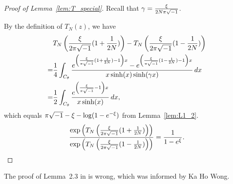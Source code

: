 \begin{proof}[Proof of Lemma~\ref{lem:T_special}]
Recall that $\gamma=\frac{\xi}{2N\pi\sqrt{-1}}$.
\par
By the definition of $T_N(z)$, we have
\begin{equation*}
\begin{split}
  &
  T_{N}\left(\frac{\xi}{2\pi\sqrt{-1}}(1+\frac{1}{2N})\right)
  -
  T_{N}\left(\frac{\xi}{2\pi\sqrt{-1}}(1-\frac{1}{2N})\right)
  \\
  =&
  \frac{1}{4}\int_{C_{\theta}}
  \frac{e^{\left(\frac{\xi}{\pi\sqrt{-1}}(1+\frac{1}{2N})-1\right)x}
       -e^{\left(\frac{\xi}{\pi\sqrt{-1}}(1-\frac{1}{2N})-1\right)x}}
       {x\sinh(x)\sinh(\gamma x)}
  \,dx
  \\
  =&
  \frac{1}{2}
  \int_{C_{\theta}}\frac{e^{\left(\frac{\xi}{\pi\sqrt{-1}}-1\right)x}}{x\sinh(x)}
  \,dx,
\end{split}
\end{equation*}
which equals $\pi\sqrt{-1}-\xi-\log(1-e^{-\xi})$ from Lemma~\ref{lem:L1_2}.
\begin{equation*}
  \frac{\exp\left(T_{N}\left(\frac{\xi}{2\pi\sqrt{-1}}(1+\frac{1}{2N})\right)\right)}
       {\exp\left(T_{N}\left(\frac{\xi}{2\pi\sqrt{-1}}(1-\frac{1}{2N})\right)\right)}
  =
  \frac{1}{1-e^{\xi}}.
\end{equation*}
\end{proof}
\begin{rem}
The proof of Lemma~2.3 in \cite{Murakami:JTOP2013} is wrong, which was informed by Ka Ho Wong.
\end{rem}